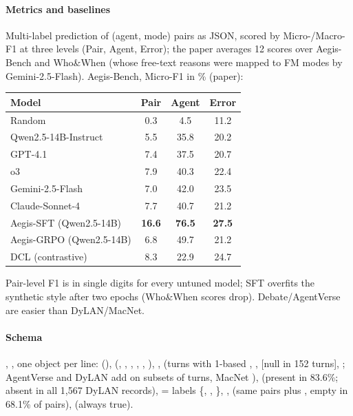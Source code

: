 \paragraph{Metrics and baselines} Multi-label prediction of (agent, mode) pairs as JSON, scored by Micro-/Macro-F1 at three levels (Pair, Agent, Error); the paper averages 12 scores over Aegis-Bench and Who\&When (whose free-text reasons were mapped to FM modes by Gemini-2.5-Flash). Aegis-Bench, Micro-F1 in \% (paper):

\begin{center}\small
\begin{tabular}{@{}lccc@{}}\toprule
Model & Pair & Agent & Error\\\midrule
Random & 0.3 & 4.5 & 11.2\\
Qwen2.5-14B-Instruct & 5.5 & 35.8 & 20.2\\
GPT-4.1 & 7.4 & 37.5 & 20.7\\
o3 & 7.9 & 40.3 & 22.4\\
Gemini-2.5-Flash & 7.0 & 42.0 & 23.5\\
Claude-Sonnet-4 & 7.7 & 40.7 & 21.2\\
Aegis-SFT (Qwen2.5-14B) & \textbf{16.6} & \textbf{76.5} & \textbf{27.5}\\
Aegis-GRPO (Qwen2.5-14B) & 6.8 & 49.7 & 21.2\\
DCL (contrastive) & 8.3 & 22.9 & 24.7\\\bottomrule
\end{tabular}
\end{center}
Pair-level F1 is in single digits for every untuned model; SFT overfits the synthetic style after two epochs (Who\&When scores drop). Debate/AgentVerse are easier than DyLAN/MacNet.

\paragraph{Schema} , , one object per line:  (\allowbreak{}),  (, , , , , ), ,  (turns with 1-based , ,  [null in 152 turns], ; AgentVerse and DyLAN add  on subsets of turns, MacNet ),  (present in 83.6\%; absent in all 1,567 DyLAN records),  = labels \{, , \}, ,  (same pairs plus , empty in 68.1\% of pairs),  (always true).

